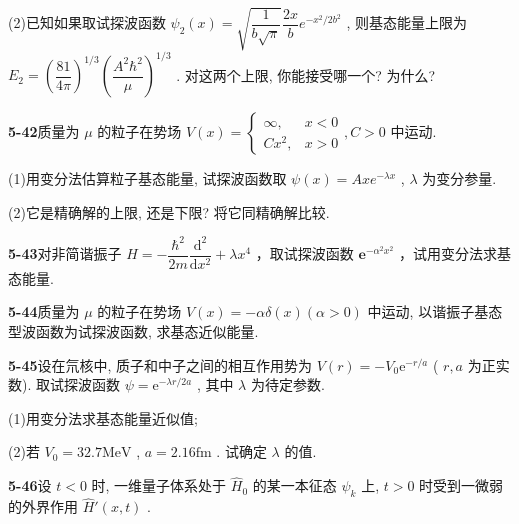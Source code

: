 (2)已知如果取试探波函数 $\displaystyle \psi_2(x) = \sqrt{\dfrac{1}{b\sqrt{\pi}}} \dfrac{2x}{b} e^{-x^2 / 2b^2}$ , 则基态能量上限为 $\displaystyle E_2 = \left(\dfrac{81}{4\pi}\right)^{1/3} \left(\dfrac{A^2\hbar^2}{\mu}\right)^{1/3}$ . 对这两个上限, 你能接受哪一个? 为什么?

\vfill

\newpage

\textbf{5-42}\quad 质量为 $\displaystyle \mu$ 的粒子在势场 $\displaystyle V(x) = \begin{cases} \infty, & x < 0 \\ Cx^2, & x > 0 \end{cases}, C > 0$ 中运动.

(1)用变分法估算粒子基态能量, 试探波函数取 $\displaystyle \psi(x) = Axe^{-\lambda x}$ , $\displaystyle \lambda$ 为变分参量.

(2)它是精确解的上限, 还是下限? 将它同精确解比较.

\vfill

\newpage

\textbf{5-43}\quad 对非简谐振子 $\displaystyle \hat{H} = -\dfrac{\hbar^2}{2m}\dfrac{\mathrm{d}^2}{\mathrm{d}x^2} + \lambda x^4$ ，取试探波函数 $\displaystyle \mathbf{e}^{-\alpha^2 x^2}$ ，试用变分法求基态能量.

\vfill

\newpage

\textbf{5-44}\quad 质量为 $\displaystyle \mu$ 的粒子在势场 $\displaystyle V(x) = -\alpha \delta (x)(\alpha >0)$ 中运动, 以谐振子基态型波函数为试探波函数, 求基态近似能量.

\vfill

\newpage

\textbf{5-45}\quad 设在氘核中, 质子和中子之间的相互作用势为 $\displaystyle V(r) = -V_0 \mathrm{e}^{-r / a}$ ( $\displaystyle r, a$ 为正实数). 取试探波函数 $\displaystyle \psi = \mathrm{e}^{-\lambda r / 2a}$ , 其中 $\displaystyle \lambda$ 为待定参数.

(1)用变分法求基态能量近似值;

(2)若 $\displaystyle V_0 = 32.7\mathrm{MeV}$ , $\displaystyle a = 2.16\mathrm{fm}$ . 试确定 $\displaystyle \lambda$ 的值.

\vfill

\newpage

\textbf{5-46}\quad 设 $\displaystyle t < 0$ 时, 一维量子体系处于 $\displaystyle \hat{H}_0$ 的某一本征态 $\displaystyle \psi_k$ 上, $\displaystyle t > 0$ 时受到一微弱的外界作用 $\displaystyle \hat{H}'(x,t)$ .

